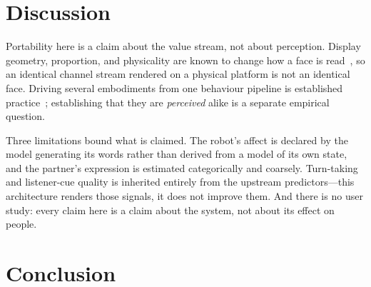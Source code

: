 \documentclass[conference]{IEEEtran}
\begin{document}
\section{Discussion}

Portability here is a claim about the value stream, not about perception.
Display geometry, proportion, and physicality are known to change how a face
is read~\cite{broadbent2013screenface, longface2026}, so an identical channel
stream rendered on a physical platform is not an identical face. Driving
several embodiments from one behaviour pipeline is established
practice~\cite{hartholt2019vhtoolkit}; establishing that they are
\emph{perceived} alike is a separate empirical question.

Three limitations bound what is claimed. The robot's affect is declared by the
model generating its words rather than derived from a model of its own state,
and the partner's expression is estimated categorically and coarsely.
Turn-taking and listener-cue quality is inherited entirely from the upstream
predictors---this architecture renders those signals, it does not improve
them. And there is no user study: every claim here is a claim about the
system, not about its effect on people.

%

\section{Conclusion}
\end{document}
